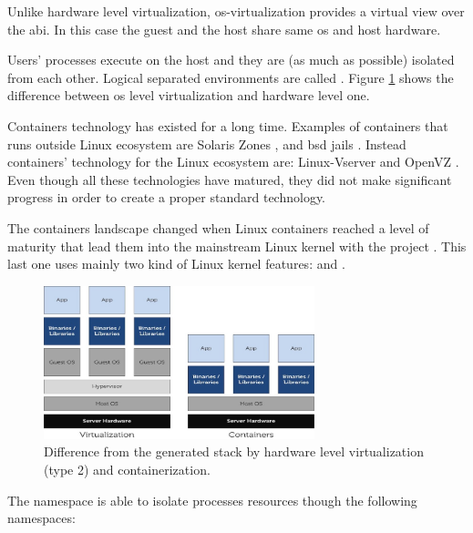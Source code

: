 Unlike hardware level virtualization, \acs{os}-virtualization  provides a virtual view over the
\ac{abi}. In this case the guest and the host share same \acs{os} and host hardware.

Users' processes execute on the host and they are (as much as possible) isolated from each other.
Logical separated environments are called .
Figure \ref{img:background-deployments-virtualization-containerization} shows the
difference between \acs{os} level virtualization and hardware level one.

Containers technology has existed for a long time. Examples of containers that runs outside Linux
ecosystem are Solaris Zones \cite{solarisContainers}, and \acs{bsd} jails \cite{bsdContainers}.
Instead containers' technology for the Linux ecosystem are: Linux-Vserver \cite{vserverContainers}
and OpenVZ \cite{openvzContainers}. Even though all these technologies have matured, they did not make
significant progress in order to create a proper standard technology.

The containers landscape changed when Linux containers reached a level of maturity that lead them 
into the mainstream Linux kernel with the project . This last one uses mainly two
kind of Linux kernel features:  and .

\begin{figure}
	\centering{}
	\includegraphics[width=0.7\textwidth]{chapters/background/images/containerization.png}
	\caption[Difference from containerization and virtualization]{Difference from the generated stack
		by hardware level virtualization (type 2) and containerization.}
	\label{img:background-deployments-virtualization-containerization}
\end{figure}

The namespace is able to isolate processes resources though the following namespaces:

